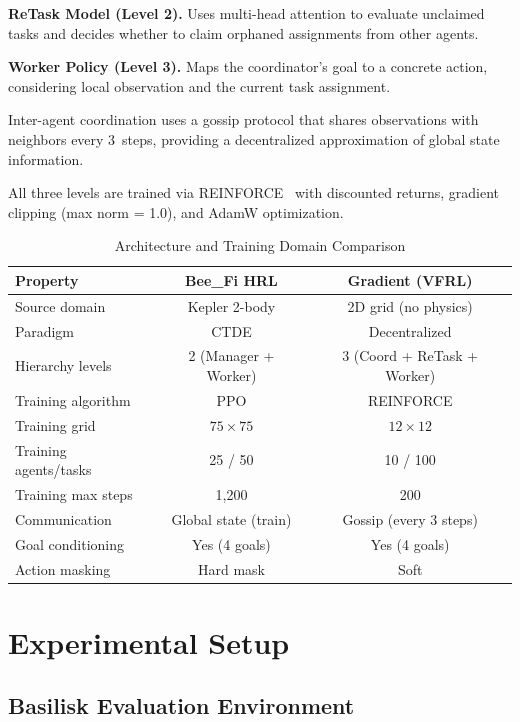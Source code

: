 \documentclass[conference]{IEEEtran}
\begin{document}
\textbf{ReTask Model (Level 2).} Uses multi-head attention to evaluate unclaimed tasks and decides whether to claim orphaned assignments from other agents.

\textbf{Worker Policy (Level 3).} Maps the coordinator's goal to a concrete action, considering local observation and the current task assignment.

Inter-agent coordination uses a gossip protocol that shares observations with neighbors every 3~steps, providing a decentralized approximation of global state information.

All three levels are trained via REINFORCE~\cite{williams1992simple} with discounted returns, gradient clipping (max norm = 1.0), and AdamW optimization.

\begin{table}[t]
\centering
\caption{Architecture and Training Domain Comparison}
\label{tab:architecture}
\begin{tabular}{@{}lcc@{}}
\toprule
\textbf{Property} & \textbf{Bee\_Fi HRL} & \textbf{Gradient (VFRL)} \\
\midrule
Source domain & Kepler 2-body & 2D grid (no physics) \\
Paradigm & CTDE & Decentralized \\
Hierarchy levels & 2 (Manager + Worker) & 3 (Coord + ReTask + Worker) \\
Training algorithm & PPO & REINFORCE \\
Training grid & $75 \times 75$ & $12 \times 12$ \\
Training agents/tasks & 25 / 50 & 10 / 100 \\
Training max steps & 1{,}200 & 200 \\
Communication & Global state (train) & Gossip (every 3 steps) \\
Goal conditioning & Yes (4 goals) & Yes (4 goals) \\
Action masking & Hard mask & Soft \\
\bottomrule
\end{tabular}
\end{table}


\section{Experimental Setup}
\label{sec:experiments}

\subsection{Basilisk Evaluation Environment}
\end{document}
